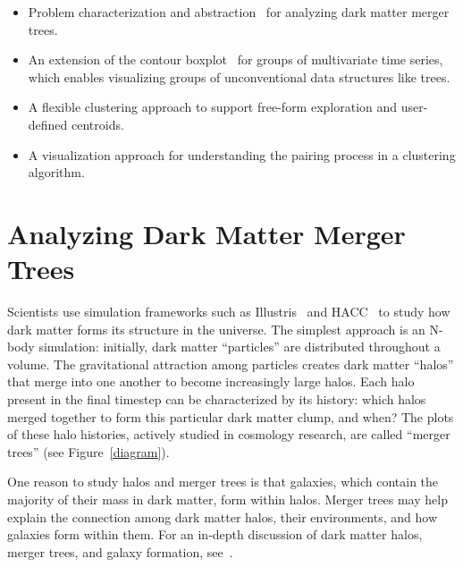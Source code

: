 \begin{itemize}
\item{Problem characterization and abstraction~\cite{trenches_stacks} for analyzing dark matter merger trees.}
\item{An extension of the contour boxplot~\cite{contour_boxplot} for groups of multivariate time series, which enables visualizing groups of unconventional data structures like trees.}
\item{A flexible clustering approach to support free-form exploration and user-defined centroids.}
\item{A visualization approach for understanding the pairing process in a clustering algorithm.}
\end{itemize}



\section{Analyzing Dark Matter Merger Trees}
\label{background}

Scientists use simulation frameworks such as Illustris~\cite{illustris_info} and HACC~\cite{hacc} to study how dark matter forms its structure in the universe. The simplest approach is an N-body simulation: initially, dark matter ``particles'' are distributed throughout a volume. The gravitational attraction among particles creates dark matter ``halos'' that merge into one another to become increasingly large halos. Each halo present in the final timestep can be characterized by its history: which halos merged together to form this particular dark matter clump, and when? The plots of these halo histories, actively studied in cosmology research, are called ``merger trees'' (see Figure~\ref{diagram}).

One reason to study halos and merger trees is that galaxies, which contain the majority of their mass in dark matter, form within halos. Merger trees may help explain the connection among dark matter halos, their environments, and how galaxies form within them. For an in-depth discussion of dark matter halos, merger trees, and galaxy formation, see~\cite{lacey1992}.

